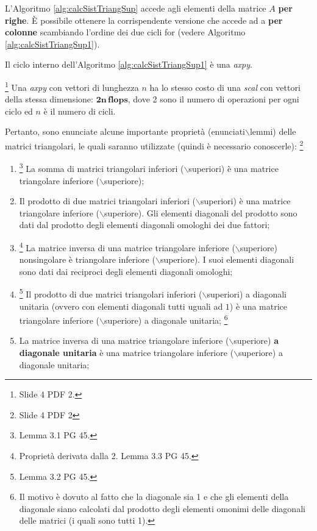 L'Algoritmo \ref{alg:calcSistTriangSup} accede agli elementi della matrice $A$ \textbf{per righe}. È possibile ottenere la corrispendente versione che accede ad a \textbf{per colonne} scambiando l'ordine dei due cicli for (vedere Algoritmo \ref{alg:calcSistTriangSup1}).

Il ciclo interno dell'Algoritmo \ref{alg:calcSistTriangSup1} è una \textit{axpy}.

\begin{remark}\footnote{Slide 4 PDF 2.}
    Una \textit{axpy} con vettori di lunghezza $n$ ha lo stesso costo di una \textit{scal} con vettori della stessa dimensione: $\boldsymbol{2n\, flops}$, dove 2 sono il numero di operazioni per ogni ciclo ed $n$ è il numero di cicli.
\end{remark}

Pertanto, sono enunciate alcune importante proprietà (enunciati$\backslash$lemmi) delle matrici triangolari, le quali saranno utilizzate (quindi è necessario conoscerle): \footnote{Slide 4 PDF 2}
\begin{enumerate}
    \item \footnote{Lemma 3.1 PG 45.} La somma di matrici triangolari inferiori ($\backslash$superiori) è una matrice triangolare inferiore ($\backslash$superiore);
    \item Il prodotto di due matrici triangolari inferiori ($\backslash$superiori) è una matrice triangolare inferiore ($\backslash$superiore). Gli elementi diagonali del prodotto sono dati dal prodotto degli elementi diagonali omologhi dei due fattori;
    \item \footnote{Proprietà derivata dalla 2. Lemma 3.3 PG 45.} La matrice inversa di una matrice triangolare inferiore ($\backslash$superiore) \gls{nonsingolare} è triangolare inferiore ($\backslash$superiore). I suoi elementi diagonali sono dati dai reciproci degli elementi diagonali omologhi;
    \item  \footnote{Lemma 3.2 PG 45.} Il prodotto di due matrici triangolari inferiori ($\backslash$superiori) a diagonali unitaria (ovvero con elementi diagonali tutti uguali ad $1$) è una matrice triangolare inferiore ($\backslash$superiore) a diagonale unitaria; \footnote{Il motivo è dovuto al fatto che la diagonale sia 1 e che gli elementi della diagonale siano calcolati dal prodotto degli elementi omonimi delle diagonali delle matrici (i quali sono tutti 1).}
    \item La matrice inversa di una matrice triangolare inferiore ($\backslash$superiore) \textbf{a diagonale unitaria} è una matrice triangolare inferiore ($\backslash$superiore) a diagonale unitaria;
\end{enumerate}

